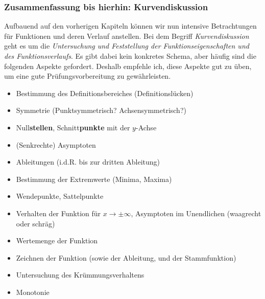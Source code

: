 \documentclass[ngerman, 12pt]{nssheetxea}
\begin{document}
\subsubsection{Zusammenfassung bis hierhin: Kurvendiskussion}
Aufbauend auf den vorherigen Kapiteln können wir nun intensive Betrachtungen für Funktionen und deren Verlauf anstellen. Bei dem Begriff \textit{Kurvendiskussion} geht es um die \textit{Untersuchung und Feststellung der Funktionseigenschaften und des Funktionsverlaufs}. Es gibt dabei kein konkretes Schema, aber häufig sind die folgenden Aspekte gefordert. Deshalb empfehle ich, diese Aspekte gut zu üben, um eine gute Prüfungsvorbereitung zu gewährleisten.
\begin{itemize}
\item Bestimmung des Definitionsbereiches (Definitionslücken)
\item Symmetrie (Punktsymmetrisch? Achsensymmetrisch?)
\item Null\textbf{stellen}, Schnitt\textbf{punkte} mit der $y$-Achse
\item (Senkrechte) Asymptoten
\item Ableitungen (i.d.R. bis zur dritten Ableitung)
\item Bestimmung der Extremwerte (Minima, Maxima)
\item Wendepunkte, Sattelpunkte
\item Verhalten der Funktion für $x\rightarrow \pm \infty$, Asymptoten im Unendlichen (waagrecht oder schräg)
\item Wertemenge der Funktion
\item Zeichnen der Funktion (sowie der Ableitung, und der Stammfunktion)
\item Untersuchung des Krümmungsverhaltens
\item Monotonie
\end{itemize}
\end{document}
